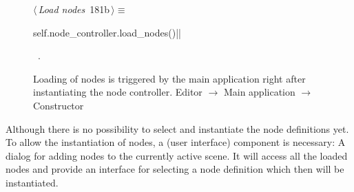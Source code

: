 \documentclass[%
    a4paper,    %
    justified,  %
    nobib,      %
    openany     %
]{tufte-book}
\makeatletter
\renewcommand{\label}[1]{\@tufte@label{##1}}%
\makeatother
\begin{document}
\begin{figure}[!htbp]
\begin{flushleft} \small
\begin{minipage}{\linewidth}\label{scrap153}\raggedright\small
{} $\langle\,${\itshape Load nodes}\nobreak\ {\footnotesize {181b}}$\,\rangle\equiv$
\vspace{-1ex}
\begin{pythoncode}
self.node_controller.load_nodes()|\NWsep|
\end{pythoncode}
\vspace{1.5ex}
\footnotesize
\begin{list}{}{\setlength{\itemsep}{-\parsep}\setlength{\itemindent}{-\leftmargin}}
\item \NWtxtMacroRefIn\ .

\item{}
\end{list}
\end{minipage}\vspace{4ex}
\end{flushleft}
\caption{Loading of nodes is triggered by the main application right after
  instantiating the node controller.
  \newline{}\newline{}Editor $\rightarrow$ Main application $\rightarrow$
  Constructor}
\end{figure}

 Although there is
no possibility to select and instantiate the node definitions yet. To allow the
instantiation of nodes, a (user interface) component is necessary: A dialog for
adding nodes to the currently active scene. It will access all the loaded nodes
and provide an interface for selecting a node definition which then will be
instantiated.
\end{document}
